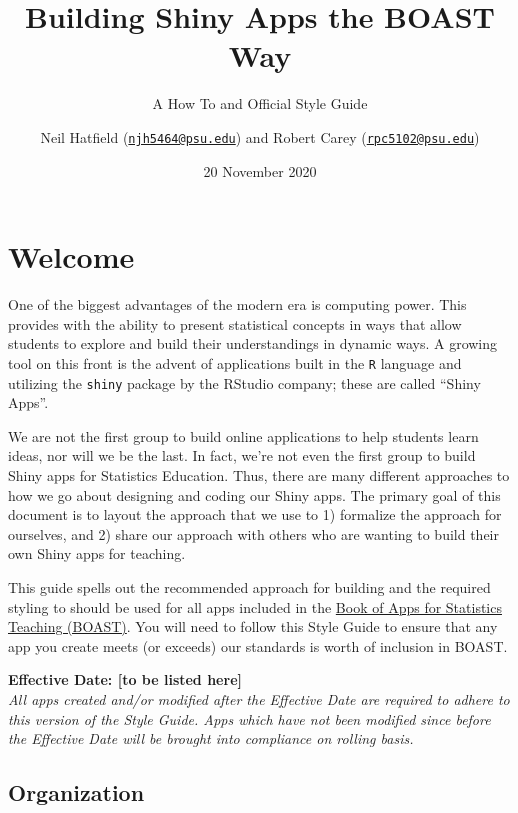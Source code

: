 \documentclass[
]{book}
\title{Building Shiny Apps the BOAST Way}
\subtitle{A How To and Official Style Guide}
\author{Neil Hatfield (\href{mailto:njh5464@psu.edu}{\nolinkurl{njh5464@psu.edu}}) and Robert Carey (\href{mailto:rpc5102@psu.edu}{\nolinkurl{rpc5102@psu.edu}})}
\date{20 November 2020}
\begin{document}
\maketitle

{
\setcounter{tocdepth}{1}
\tableofcontents
}
\hypertarget{welcome}{%
\chapter*{Welcome}\label{welcome}}

One of the biggest advantages of the modern era is computing power. This provides with the ability to present statistical concepts in ways that allow students to explore and build their understandings in dynamic ways. A growing tool on this front is the advent of applications built in the \texttt{R} language and utilizing the \texttt{shiny} package by the RStudio company; these are called ``Shiny Apps''.

We are not the first group to build online applications to help students learn ideas, nor will we be the last. In fact, we're not even the first group to build Shiny apps for Statistics Education. Thus, there are many different approaches to how we go about designing and coding our Shiny apps. The primary goal of this document is to layout the approach that we use to 1) formalize the approach for ourselves, and 2) share our approach with others who are wanting to build their own Shiny apps for teaching.

This guide spells out the recommended approach for building and the required styling to should be used for all apps included in the \href{https://github.com/EducationShinyAppTeam/BOAST}{Book of Apps for Statistics Teaching (BOAST)}. You will need to follow this Style Guide to ensure that any app you create meets (or exceeds) our standards is worth of inclusion in BOAST.

\textbf{Effective Date: {[}to be listed here{]}}\\
\emph{All apps created and/or modified after the Effective Date are required to adhere to this version of the Style Guide. Apps which have not been modified since before the Effective Date will be brought into compliance on rolling basis.}

\hypertarget{organization}{%
\section{Organization}\label{organization}}
\end{document}
